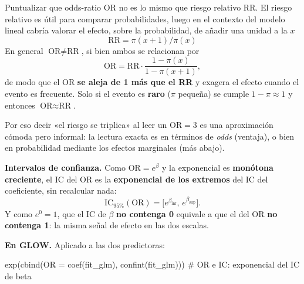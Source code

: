 \documentclass[
  letterpaper,
  DIV=11,
  numbers=noendperiod]{scrartcl}
\newenvironment{Shaded}{\begin{snugshade}}{\end{snugshade}}
\newcommand{\AttributeTok}[1]{\textcolor[rgb]{0.40,0.45,0.13}{#1}}
\newcommand{\CommentTok}[1]{\textcolor[rgb]{0.37,0.37,0.37}{#1}}
\newcommand{\FunctionTok}[1]{\textcolor[rgb]{0.28,0.35,0.67}{#1}}
\newcommand{\NormalTok}[1]{\textcolor[rgb]{0.00,0.23,0.31}{#1}}
\begin{document}
\begin{tcolorbox}[enhanced jigsaw, coltitle=black, rightrule=.15mm, arc=.35mm, leftrule=.75mm, colback=white, colbacktitle=quarto-callout-warning-color!10!white, left=2mm, breakable, toptitle=1mm, toprule=.15mm, bottomtitle=1mm, titlerule=0mm, title=\textcolor{quarto-callout-warning-color}{\faExclamationTriangle}\hspace{0.5em}{Odds ratio y riesgo relativo}, bottomrule=.15mm, opacityback=0, opacitybacktitle=0.6, colframe=quarto-callout-warning-color-frame]

Puntualizar que odds-ratio OR no es lo mismo que riesgo relativo RR. El
riesgo relativo es útil para comparar probabilidades, luego en el
contexto del modelo lineal cabría valorar el efecto, sobre la
probabilidad, de añadir una unidad a la \(x\)
\[\text{RR}=\pi(x+1)/\pi(x)\] En general \(\text{OR}\neq\text{RR}\), si
bien ambos se relacionan por \[
\text{OR}=\text{RR}\cdot\frac{1-\pi(x)}{1-\pi(x+1)},
\] de modo que el OR \textbf{se aleja de 1 más que el RR} y exagera el
efecto cuando el evento es frecuente. Solo si el evento es \textbf{raro}
(\(\pi\) pequeña) se cumple \(1-\pi\approx 1\) y entonces
\(\text{OR}\approx\text{RR}\).

Por eso decir «el riesgo se triplica» al leer un \(\text{OR}=3\) es una
aproximación cómoda pero informal: la lectura exacta es en términos de
\emph{odds} (ventaja), o bien en probabilidad mediante los efectos
marginales (más abajo).

\end{tcolorbox}

\textbf{Intervalos de confianza.} Como \(\text{OR}=e^{\beta}\) y la
exponencial es \textbf{monótona creciente}, el IC del OR es la
\textbf{exponencial de los extremos} del IC del coeficiente, sin
recalcular nada:
\[\text{IC}_{95\%}(\text{OR})=\big[e^{\beta_{\text{inf}}},\,e^{\beta_{\text{sup}}}\big].\]
Y como \(e^{0}=1\), que el IC de \(\beta\) \textbf{no contenga 0}
equivale a que el del OR \textbf{no contenga 1}: la misma señal de
efecto en las dos escalas.

\textbf{En GLOW.} Aplicado a las dos predictoras:

\begin{Shaded}
\begin{Highlighting}[]
\FunctionTok{exp}\NormalTok{(}\FunctionTok{cbind}\NormalTok{(}\AttributeTok{OR =} \FunctionTok{coef}\NormalTok{(fit\_glm), }\FunctionTok{confint}\NormalTok{(fit\_glm)))   }\CommentTok{\# OR e IC: exponencial del IC de beta}
\end{Highlighting}
\end{Shaded}
\end{document}
